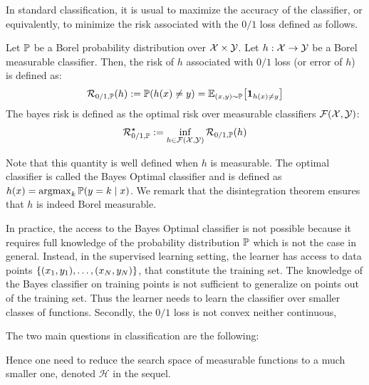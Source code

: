 In standard classification, it is usual to maximize the accuracy of the classifier, or equivalently, to minimize the risk associated with the $0/1$ loss defined as follows.

    
\begin{definition} Let $\mathbb{P}$ be a Borel probability distribution over $\mathcal{X}\times\mathcal{Y}$. Let $h:\mathcal{X}\to\mathcal{Y}$ be a Borel measurable classifier. Then, the risk of $h$ associated with $0/1$ loss (or error of $h$) is defined as:
\begin{align}
   \risk_{0/1,\PP}(h):=\PP(h(x)\neq y) = \EE_{(x,y)\sim\PP}\left[\mathbf{1}_{h(x)\neq y}\right]
\end{align}
The bayes risk is defined as the optimal risk over measurable classifiers $\mathcal{F}(\mathcal{X},\mathcal{Y})$:
\begin{align}
    \mathcal{R}^\star_{0/1,\mathbb{P}}:=\inf_{h\in\mathcal{F}(\mathcal{X},\mathcal{Y})}\mathcal{R}_{0/1,\mathbb{P}}(h)
 \end{align}

\end{definition}

Note that this quantity is well defined when $h$ is measurable. The optimal classifier is called the Bayes Optimal classifier and is defined as $h(x) = \operatorname*{argmax}_k\mathbb{P}(y=k\mid x)$. We remark that the disintegration theorem ensures that $h$ is indeed Borel measurable.

In practice, the access to the Bayes Optimal classifier is not possible because it requires full knowledge of the probability distribution $\mathbb{P}$ which is not the case in general. Instead, in the supervised learning setting, the learner has access to data points $\{(x_1,y_1),\dots,(x_N,y_N)\}$, that constitute the training set. The knowledge of the Bayes classifier on training points is not sufficient to generalize on points out of the training set. Thus the learner needs to learn the classifier over smaller classes of functions. Secondly, the $0/1$ loss is not convex neither continuous, 




The two main questions in classification are the following:

Hence one need to reduce the search space of measurable functions to a much smaller one, denoted $\mathcal{H}$ in the sequel.

